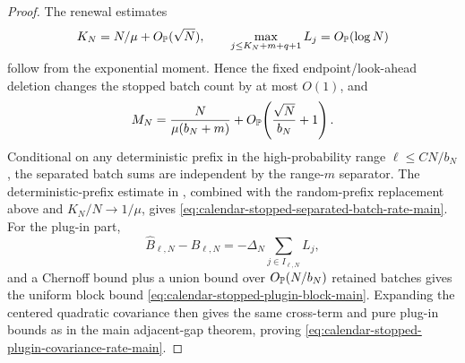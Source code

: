 \begin{proof}
The renewal estimates
\[
K_N=N/\mu+O_{\mathbb P}(\sqrt N),\qquad
\max_{j\le K_N+m+q+1}L_j=O_{\mathbb P}(\log N)
\]
follow from the exponential moment.  Hence the fixed endpoint/look-ahead
deletion changes the stopped batch count by at most \(O(1)\), and
\[
M_N=\frac{N}{\mu(b_N+m)}
     +O_{\mathbb P}\!\left(\frac{\sqrt N}{b_N}+1\right).
\]
Conditional on any deterministic prefix in the high-probability range
\(\ell\le C N/b_N\), the separated batch sums are independent by the
range-\(m\) separator.  The deterministic-prefix estimate in
, combined with the
random-prefix replacement above and \(K_N/N\to1/\mu\), gives
\eqref{eq:calendar-stopped-separated-batch-rate-main}.  For the plug-in part,
\[
\widehat B_{\ell,N}-B_{\ell,N}
=-\Delta_N\sum_{j\in I_{\ell,N}}L_j,
\]
and a Chernoff bound plus a union bound over \(O_{\mathbb P}(N/b_N)\) retained
batches gives the uniform block bound
\eqref{eq:calendar-stopped-plugin-block-main}.  Expanding the centered
quadratic covariance then gives the same cross-term and pure plug-in bounds as
in the main adjacent-gap theorem, proving
\eqref{eq:calendar-stopped-plugin-covariance-rate-main}.
\end{proof}

